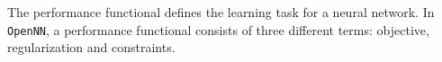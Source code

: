 
The performance functional defines the learning task for a neural network. 
In \texttt{OpenNN}, a performance functional consists of three different terms: objective, 
regularization and constraints.


